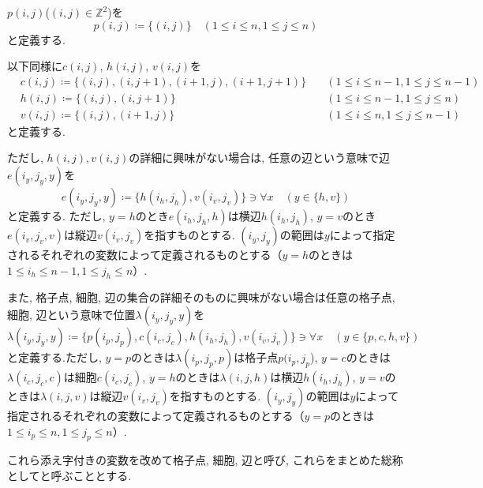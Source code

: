 \begin{definition}[格子点$p(i,j)$, 細胞$c(i,j)$, 横辺$h(i,j)$, 縦辺$v(i,j)$]\label{definition:VariableAtBoard}
  $p(i,j)$($(i,j)\in \mathbb{Z}^2$)を
  \begin{equation*}
    p(i,j)\coloneqq \{(i,j)\} \quad (1\leq i \leq n, 1\leq j \leq n)
  \end{equation*}
  と定義する.

  以下同様に$c(i,j)$, $h(i,j)$, $v(i,j)$を
  \begin{align*}
     & c(i,j)\coloneqq  \{(i,j), (i,j+1), (i+1,j), (i+1,j+1)\}  \quad & (1\leq i \leq n-1, 1\leq j \leq n-1) \\
     & h(i,j)\coloneqq  \{(i,j), (i,j+1)\}                      \quad & (1\leq i \leq n-1, 1\leq j \leq n)   \\
     & v(i,j)\coloneqq  \{(i,j), (i+1,j)\}                      \quad & (1\leq i \leq n, 1\leq j \leq n-1)
  \end{align*}
  と定義する.

  ただし, $h(i,j),v(i,j)$の詳細に興味がない場合は, 任意の辺という意味で辺$e(i_y,j_y,y)$を
  \begin{equation*}
    e(i_y,j_y,y) \coloneqq \{h(i_h,j_h), v(i_v,j_v)\}\ni \forall x \quad (y \in \{h,v\})
  \end{equation*}
  と定義する.
  ただし, $y=h$のとき$e(i_h,j_h,h)$は横辺$h(i_h,j_h)$, $y=v$のとき$e(i_v,j_v,v)$は縦辺$v(i_v,j_v)$を指すものとする. $(i_y,j_y)$の範囲は$y$によって指定されるそれぞれの変数によって定義されるものとする（$y=h$のときは$1\leq i_h \leq n-1,1\leq j_h \leq n$）.

  また, 格子点, 細胞, 辺の集合の詳細そのものに興味がない場合は任意の格子点, 細胞, 辺という意味で位置$\lambda(i_y,j_y,y)$を
  \begin{equation*}
    \lambda(i_y,j_y,y) \coloneqq \{p(i_p,j_p),c(i_c,j_c),h(i_h,j_h),v(i_v,j_v)\}\ni \forall x \quad (y \in \{p,c,h,v\})
  \end{equation*}
  と定義する.ただし, $y=p$のときは$\lambda(i_p,j_p,p)$は格子点$p(i_p,j_p$), $y=c$のときは$\lambda(i_c,j_c,c)$は細胞$c(i_c,j_c)$, $y=h$のときは$\lambda(i,j,h)$は横辺$h(i_h,j_h)$, $y=v$のときは$\lambda(i,j,v)$は縦辺$v(i_v,j_v)$を指すものとする. $(i_y,j_y)$の範囲は$y$によって指定されるそれぞれの変数によって定義されるものとする（$y=p$のときは$1\leq i_p \leq n,1\leq j_p \leq n$）.
\end{definition}
これら添え字付きの変数を改めて格子点, 細胞, 辺と呼び, これらをまとめた総称としてと呼ぶこととする.



